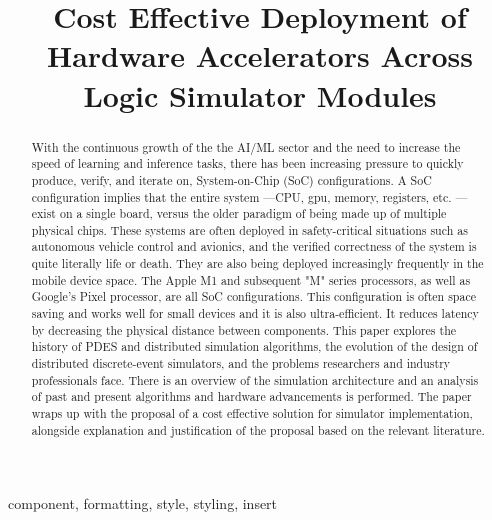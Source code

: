 \documentclass[conference]{IEEEtran}
\begin{document}
\title{Cost Effective Deployment of Hardware Accelerators Across Logic Simulator Modules}

\author{
}

\maketitle

\begin{abstract}
With the continuous growth of the the AI/ML sector and the need to increase the speed of learning and inference tasks, there has been increasing pressure to quickly produce, verify, and iterate on, System-on-Chip (SoC) configurations. A SoC configuration implies that the entire system ---CPU, gpu, memory, registers, etc. --- exist on a single board, versus the older paradigm of being made up of multiple physical chips. These systems are often deployed in safety-critical situations such as autonomous vehicle control and avionics, and the verified correctness of the system is quite literally life or death. They are also being deployed increasingly frequently in the mobile device space. The Apple M1 and subsequent "M" series processors, as well as Google's Pixel processor, are all SoC configurations. This configuration is often space saving and works well for small devices and it is also ultra-efficient. It reduces latency by decreasing the physical distance between components. This paper explores the history of PDES and distributed simulation algorithms, the evolution of the design of distributed discrete-event simulators, and the problems researchers and industry professionals face. There is an overview of the simulation architecture and an analysis of past and present algorithms and hardware advancements is performed. The paper wraps up with the proposal of a cost effective solution for simulator implementation, alongside explanation and justification of the proposal based on the relevant literature.
\end{abstract}

\begin{IEEEkeywords}
component, formatting, style, styling, insert
\end{IEEEkeywords}
\end{document}
